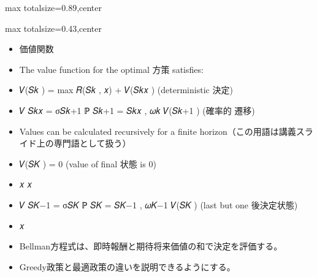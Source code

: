 \begin{minipage}[t]{0.58\textwidth}
\begin{adjustbox}{max totalsize={\textwidth}{0.89\textheight},center}
\begin{minipage}{\textwidth}
\end{minipage}
\end{adjustbox}
\end{minipage}


\clearpage
{}
\begin{minipage}[t]{0.405\textwidth}
\begin{adjustbox}{max totalsize={\textwidth}{0.43\textheight},center}
\begin{minipage}{\textwidth}\scriptsize
{}\begin{itemize}
\item 価値関数
\item The value function for the optimal 方策 satisfies:
\item 𝑉(𝑆𝑘 ) = max 𝑅(𝑆𝑘 , 𝑥) + 𝑉(𝑆𝑘𝑥 ) (deterministic 決定)
\item 𝑉 𝑆𝑘𝑥 = σ𝑆𝑘+1 ℙ 𝑆𝑘+1 = 𝑆𝑘𝑥 , 𝜔𝑘 𝑉(𝑆𝑘+1 ) (確率的 遷移)
\item Values can be calculated recursively for a finite horizon（この用語は講義スライド上の専門語として扱う）
\item 𝑉(𝑆𝐾 ) = 0 (value of final 状態 is 0)
\item 𝑥 𝑥
\item 𝑉 𝑆𝐾−1 = σ𝑆𝐾 ℙ 𝑆𝐾 = 𝑆𝐾−1 , 𝜔𝐾−1 𝑉(𝑆𝐾 ) (last but one 後決定状態)
\item 𝑥
\end{itemize}\begin{itemize}
\item Bellman方程式は、即時報酬と期待将来価値の和で決定を評価する。
\item Greedy政策と最適政策の違いを説明できるようにする。
\end{itemize}
\end{minipage}
\end{adjustbox}
\end{minipage}\hfill
